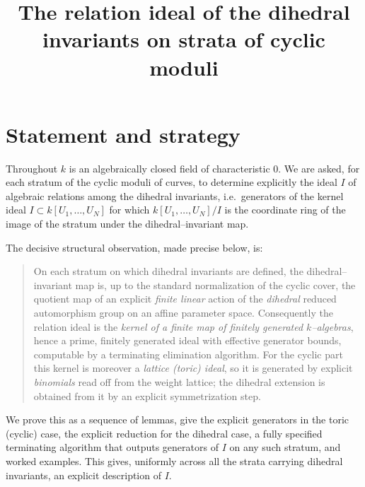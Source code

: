 \documentclass{amsart}
\theoremstyle{definition}
\begin{document}
\title{The relation ideal of the dihedral invariants on strata of cyclic moduli}
\maketitle

\section{Statement and strategy}

Throughout $k$ is an algebraically closed field of characteristic $0$.
We are asked, for each stratum of the cyclic moduli of curves, to determine
explicitly the ideal $I$ of algebraic relations among the dihedral invariants,
i.e.\ generators of the kernel ideal $I\subset k[U_1,\dots,U_N]$ for which
$k[U_1,\dots,U_N]/I$ is the coordinate ring of the image of the stratum under
the dihedral--invariant map.

The decisive structural observation, made precise below, is:

\begin{quote}
On each stratum on which dihedral invariants are defined, the
dihedral--invariant map is, up to the standard normalization of the cyclic
cover, the quotient map of an explicit \emph{finite linear} action of the
\emph{dihedral} reduced automorphism group on an affine parameter space.
Consequently the relation ideal is the \emph{kernel of a finite map of finitely
generated $k$--algebras}, hence a prime, finitely generated ideal with
effective generator bounds, computable by a terminating elimination algorithm.
For the cyclic part this kernel is moreover a \emph{lattice (toric) ideal}, so it
is generated by explicit \emph{binomials} read off from the weight lattice; the
dihedral extension is obtained from it by an explicit symmetrization step.
\end{quote}

We prove this as a sequence of lemmas, give the explicit generators in the toric
(cyclic) case, the explicit reduction for the dihedral case, a fully specified
terminating algorithm that outputs generators of $I$ on any such stratum, and
worked examples. This gives, uniformly across all the strata carrying dihedral
invariants, an explicit description of $I$.
\end{document}
